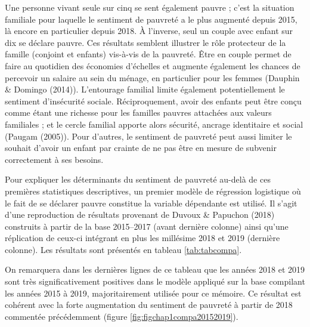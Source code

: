 \documentclass[12pt,a4paper]{reedthesis}
\begin{document}
Une personne vivant seule sur cinq se sent également pauvre ; c'est la situation familiale pour laquelle le sentiment de pauvreté a le plus augmenté depuis 2015, là encore en particulier depuis 2018. À l'inverse, seul un couple avec enfant sur dix se déclare pauvre. Ces résultats semblent illustrer le rôle protecteur de la famille (conjoint et enfants) vis-à-vis de la pauvreté. Être en couple permet de faire au quotidien des économies d'échelles et augmente également les chances de percevoir un salaire au sein du ménage, en particulier pour les femmes (Dauphin \& Domingo (2014)). L'entourage familial limite également potentiellement le sentiment d'insécurité sociale. Réciproquement, avoir des enfants peut être conçu comme étant une richesse pour les familles pauvres attachées aux valeurs familiales ; et le cercle familial apporte alors sécurité, ancrage identitaire et social (Paugam (2005)). Pour d'autres, le sentiment de pauvreté peut aussi limiter le souhait d'avoir un enfant par crainte de ne pas être en mesure de subvenir correctement à ses besoins.

Pour expliquer les déterminants du sentiment de pauvreté au-delà de ces premières statistiques descriptives, un premier modèle de régression logistique où le fait de se déclarer pauvre constitue la variable dépendante est utilisé. Il s'agit d'une reproduction de résultats provenant de Duvoux \& Papuchon (2018) construits à partir de la base 2015--2017 (avant dernière colonne) ainsi qu'une réplication de ceux-ci intégrant en plus les millésime 2018 et 2019 (dernière colonne). Les résultats sont présentés en tableau \ref{tab:tabcompa}.

On remarquera dans les dernières lignes de ce tableau que les années 2018 et 2019 sont très significativement positives dans le modèle appliqué sur la base compilant les années 2015 à 2019, majoritairement utilisée pour ce mémoire. Ce résultat est cohérent avec la forte augmentation du sentiment de pauvreté à partir de 2018 commentée précédemment (figure \ref{fig:figchap1compa20152019}).
\end{document}
